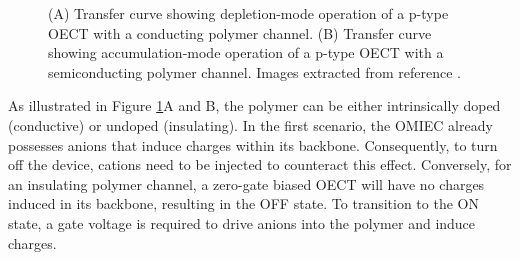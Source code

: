 \begin{figure}[h]
	\centering
	\hspace{2em}
	\caption[Depletion- and accumulation-mode OECTs]{(A) Transfer curve showing depletion-mode operation of a p-type OECT with a conducting polymer channel. (B) Transfer curve showing accumulation-mode operation of a p-type OECT with a semiconducting polymer channel. Images extracted from reference \cite{rivnayOrganicElectrochemicalTransistors2018}.}
	\label{fig:modes}
\end{figure}

As illustrated in Figure \ref{fig:modes}A and B, the polymer can be either intrinsically doped (conductive) or undoped (insulating). In the first scenario, the OMIEC already possesses anions that induce charges within its backbone. Consequently, to turn off the device, cations need to be injected to counteract this effect. Conversely, for an insulating polymer channel, a zero-gate biased OECT will have no charges induced in its backbone, resulting in the OFF state. To transition to the ON state, a gate voltage is required to drive anions into the polymer and induce charges.

